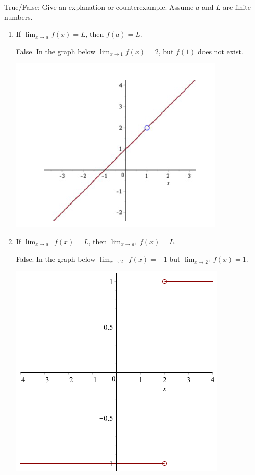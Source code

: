 \documentclass[nooutcomes]{ximera}
\begin{document}
\begin{problem}
True/False:  Give an explanation or counterexample.  Assume $a$ and $L$ are finite numbers.
	
			\begin{enumerate}

			\item  If $ \lim_{x \to a} f(x) = L$, then $f(a) = L$.
			\begin{freeResponse}
			False.  In the graph below $ \lim_{x \to 1} f(x) = 2 $, but $f(1)$ does not exist.
				\begin{image}
				      \includegraphics{Figure1}
				\end{image}
			\end{freeResponse}
			
			\item  If $  \lim_{x \to a^-} f(x) = L$, then $  \lim_{x \to a^+} f(x) = L $.
			\begin{freeResponse}
			False.  In the graph below $ \lim_{x \to 2^-} f(x) = -1$ but $ \lim_{x \to 2^+} f(x) = 1$.
			
				\begin{image}
						      \includegraphics[scale=.7]{Figure2}		
				\end{image}
			\end{freeResponse}
			

\end{enumerate}
\end{problem}
\end{document}
